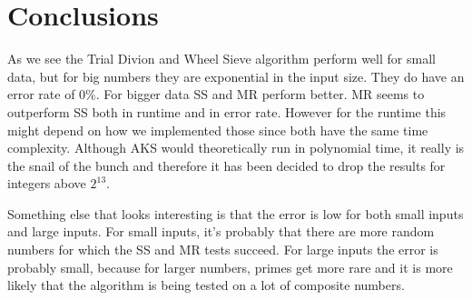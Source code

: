 \section{Conclusions}


As we see the Trial Divion and Wheel Sieve algorithm perform well for small data, but for big numbers they are exponential in the input size.
They do have an error rate of $0\%$.
For bigger data SS and MR perform better.
MR seems to outperform SS both in runtime and in error rate.
However for the runtime this might depend on how we implemented those since both have the same time complexity.
Although AKS would theoretically run in polynomial time, it really is the snail of the bunch and therefore it has been decided to drop the results for integers above $2^{13}$.

Something else that looks interesting is that the error is low for both small inputs and large inputs.
For small inputs, it's probably that there are more random numbers for which the SS and MR tests succeed.
For large inputs the error is probably small, because for larger numbers, primes get more rare and it is more likely that the algorithm is being tested on a lot of composite numbers.
